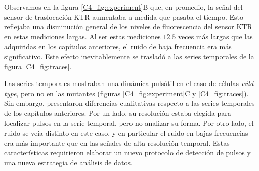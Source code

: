 \documentclass[./main.tex]{subfiles}
\begin{document}
Observamos en la figura \ref{C4_fig:experiment}B que, en promedio, la señal del sensor de traslocación KTR aumentaba a medida que pasaba el tiempo. Esto reflejaba una disminución general de los niveles de fluorescencia del sensor KTR en estas mediciones largas. Al ser estas mediciones $12.5$ veces más largas que las adquiridas en los capítulos anteriores, el ruido de baja frecuencia era más significativo. Este efecto inevitablemente se trasladó a las series temporales de la figura \ref{C4_fig:traces}. 

Las series temporales mostraban una dinámica pulsátil en el caso de células \textit{wild type}, pero no en las mutantes (figuras \ref{C4_fig:experiment}C y \ref{C4_fig:traces}). Sin embargo, presentaron diferencias cualitativas respecto a las series temporales de los capítulos anteriores. Por un lado, su resolución estaba elegida para localizar pulsos en la serie temporal, pero no analizar su forma. Por otro lado, el ruido se veía distinto en este caso, y en particular el ruido en bajas frecuencias era más importante que en las señales de alta resolución temporal. Estas características requirieron elaborar un nuevo protocolo de detección de pulsos y una nueva estrategia de análisis de datos. 
\end{document}
